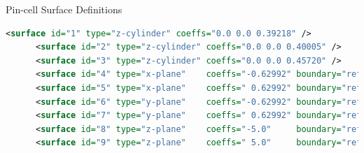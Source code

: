 \documentclass[serif]{beamer}
\begin{document}

\begin{frame}[fragile]{Pin-cell Surface Definitions}

  \begin{scriptsize}
    \begin{lstlisting}[language=XML]
      <surface id="1" type="z-cylinder" coeffs="0.0 0.0 0.39218" />
      <surface id="2" type="z-cylinder" coeffs="0.0 0.0 0.40005" />
      <surface id="3" type="z-cylinder" coeffs="0.0 0.0 0.45720" />
      <surface id="4" type="x-plane"    coeffs="-0.62992" boundary="reflective" />
      <surface id="5" type="x-plane"    coeffs=" 0.62992" boundary="reflective" />
      <surface id="6" type="y-plane"    coeffs="-0.62992" boundary="reflective" />
      <surface id="7" type="y-plane"    coeffs=" 0.62992" boundary="reflective" />
      <surface id="8" type="z-plane"    coeffs="-5.0"     boundary="reflective" />
      <surface id="9" type="z-plane"    coeffs=" 5.0"     boundary="reflective" /> 
    \end{lstlisting}
  \end{scriptsize}
  \vfill
  \begin{center}
  \end{center}

\end{frame}

\end{document}
